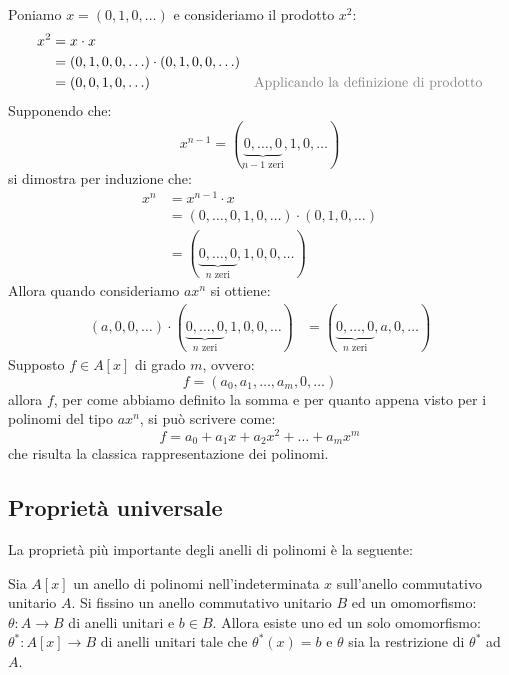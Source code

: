 Poniamo $x=(0,1,0,\ldots)$ e consideriamo il prodotto $x^{2}$:
\begin{align*}
	x^{2} &= x \cdot x \\
	&= (0,1,0,0,\ldots) \cdot (0,1,0,0,\ldots)\\
	&= (0,0,1,0,\ldots) & \text{\textcolor{gray}{Applicando la definizione di prodotto}}
\end{align*}
Supponendo che: $$x^{n-1}= (\underbrace{0,\ldots,0}_{\text{$n-1$ zeri}},1,0,\ldots)$$ si dimostra per induzione che:
\begin{align*}
	x^{n} &= x^{n-1}\cdot x\\
	&= (0,\ldots,0,1,0,\ldots) \cdot (0,1,0,\ldots)\\
	&= (\underbrace{0,\ldots,0}_{\text{$n$ zeri}},1,0,0,\ldots)
\end{align*}
Allora quando consideriamo $ax^{n}$ si ottiene:
\begin{align*}
	(a,0,0,\ldots)\cdot (\underbrace{0,\ldots,0}_{\text{$n$ zeri}},1,0,0,\ldots) &= (\underbrace{0,\ldots,0}_{\text{$n$ zeri}},a,0,\ldots)
\end{align*}
Supposto $f \in A[x]$ di grado $m$, ovvero:
\begin{displaymath}
	f= (a_{0},a_{1},\ldots,a_{m},0,\ldots)
\end{displaymath}
allora $f$, per come abbiamo definito la somma e per quanto appena visto per i polinomi del tipo $ax^{n}$, si può scrivere come:
\begin{equation}\label{eq:polinomio}
	f = a_{0} + a_{1}x + a_{2}x^{2}+\ldots+a_{m}x^{m}
\end{equation}
che risulta la classica rappresentazione dei polinomi.

\subsection{Proprietà universale}
La proprietà più importante degli anelli di polinomi è la seguente:

\begin{propbox}
	Sia $A[x]$ un anello di polinomi nell’indeterminata $x$ sull’anello commutativo unitario $A$. Si fissino un anello commutativo unitario $B$ ed un omomorfismo: $\theta: A \longrightarrow B$ di anelli unitari e $b \in B$. Allora esiste uno ed un solo omomorfismo: $\theta^{*}: A[x] \longrightarrow B$ di anelli unitari tale che $\theta^{*}(x)=b$ e $\theta$ sia la restrizione di $\theta^{*}$ ad $A$.
\end{propbox}


